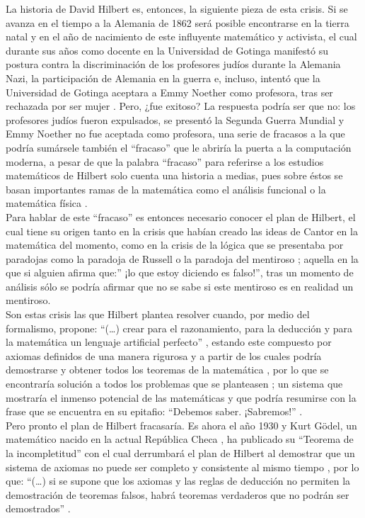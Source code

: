 \documentclass[a4paper,11pt]{article}
\begin{document}
La historia de David Hilbert es, entonces, la siguiente pieza de esta crisis. Si se avanza en el tiempo a la Alemania de 1862 \cite{barral_2017} será posible encontrarse en la tierra natal y en el año de nacimiento de este influyente matemático y activista, el cual durante sus años como docente en la Universidad de Gotinga manifestó su postura contra la discriminación de los profesores judíos durante la Alemania Nazi, la participación de Alemania en la guerra e, incluso, intentó que la Universidad de Gotinga aceptara a Emmy Noether como profesora, tras ser rechazada por ser mujer \cite{barral_2017}. Pero, ¿fue exitoso? La respuesta podría ser que no: los profesores judíos fueron expulsados, se presentó la Segunda Guerra Mundial y Emmy Noether no fue aceptada como profesora, una serie de fracasos a la que podría sumársele también el “fracaso” que le abriría la puerta a la computación moderna, a pesar de que la palabra “fracaso” para referirse a los estudios matemáticos de Hilbert solo cuenta una historia a medias, pues sobre éstos se basan importantes ramas de la matemática como el análisis funcional o la matemática física \cite{barral_2017}.\\
Para hablar de este “fracaso” es entonces necesario conocer el plan de Hilbert, el cual tiene su origen tanto en la crisis que habían creado las ideas de Cantor en la matemática del momento, como en la crisis de la lógica que se presentaba por paradojas como la paradoja de Russell o la paradoja del mentiroso \cite{chaitin2003ordenadores}; aquella en la que si alguien afirma que:” ¡lo que estoy diciendo es falso!”, tras un momento de análisis sólo se podría afirmar que no se sabe si este mentiroso es en realidad un mentiroso. \\
Son estas crisis las que Hilbert plantea resolver cuando, por medio del formalismo, propone: “(…) crear para el razonamiento, para la deducción y para la matemática un lenguaje artificial perfecto” \cite[p.3]{chaitin2003ordenadores}, estando este compuesto por axiomas definidos de una manera rigurosa y a partir de los cuales podría demostrarse y obtener todos los teoremas de la matemática \cite{chaitin2003ordenadores}, por lo que se encontraría solución a todos los problemas que se planteasen \cite{barral_2017}; un sistema que mostraría el inmenso potencial de las matemáticas y que podría resumirse con la frase que se encuentra en su epitafio: “Debemos saber. ¡Sabremos!” \cite{bombal_2018}. \\
Pero pronto el plan de Hilbert fracasaría. Es ahora el año 1930 y Kurt Gödel, un matemático nacido en la actual República Checa \cite{rago_2016}, ha publicado su “Teorema de la incompletitud” con el cual derrumbará el plan de Hilbert al demostrar que un sistema de axiomas no puede ser completo y consistente al mismo tiempo \cite{rago_2016}, por lo que: “(…) si se supone que los axiomas y las reglas de deducción no permiten la demostración de teoremas falsos, habrá teoremas verdaderos que no podrán ser demostrados” \cite[p.4]{chaitin2003ordenadores}. \\
\end{document}
